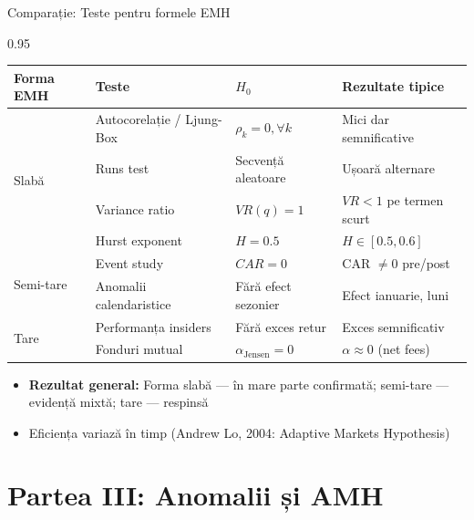 \documentclass[9pt, aspectratio=169, t]{beamer}
\begin{document}
\begin{frame}{Comparație: Teste pentru formele EMH}
    \begin{cminipage}{0.95\textwidth}
\renewcommand{\arraystretch}{1.2}
\begin{center}
\footnotesize
\begin{tabular}{llll}
\toprule
\textbf{Forma EMH} & \textbf{Teste} & \textbf{$H_0$} & \textbf{Rezultate tipice} \\
\midrule
\multirow{4}{*}{Slabă} & Autocorelație / Ljung-Box & $\rho_k = 0, \forall k$ & Mici dar semnificative \\
 & Runs test & Secvență aleatoare & Ușoară alternare \\
 & Variance ratio & $VR(q) = 1$ & $VR < 1$ pe termen scurt \\
 & Hurst exponent & $H = 0.5$ & $H \in [0.5, 0.6]$ \\
\midrule
\multirow{2}{*}{Semi-tare} & Event study & $CAR = 0$ & CAR $\neq 0$ pre/post \\
 & Anomalii calendaristice & Fără efect sezonier & Efect ianuarie, luni \\
\midrule
\multirow{2}{*}{Tare} & Performanța insiders & Fără exces retur & Exces semnificativ \\
 & Fonduri mutual & $\alpha_{\text{Jensen}} = 0$ & $\alpha \approx 0$ (net fees) \\
\bottomrule
\end{tabular}
\end{center}

\vspace{0.2cm}
\begin{itemize}\setlength{\itemsep}{0pt}
    \item \textbf{Rezultat general:} Forma slabă --- în mare parte confirmată; semi-tare --- evidență mixtă; tare --- respinsă
    \item Eficiența variază în timp (Andrew Lo, 2004: Adaptive Markets Hypothesis)
\end{itemize}

    \end{cminipage}
\end{frame}

\section{Partea III: Anomalii și AMH}
\end{document}
